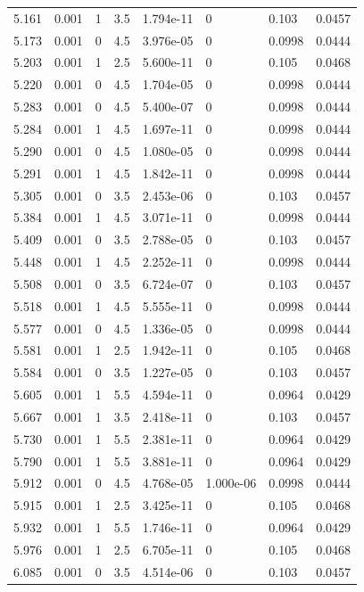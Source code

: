 \documentclass[preview]{standalone}
\begin{document}
{{{\begin{tabular}{L{1.2cm}C{1.2cm} C{0.3cm}C{0.5cm} C{1.4cm}C{1.4cm} C{1.4cm}C{1.4cm}}
  5.161  &  0.001  & 1     & 3.5 &  1.794e-11  & 0  & 0.103 &  0.0457   \\ 
  5.173  &  0.001  & 0     & 4.5 &  3.976e-05  & 0  & 0.0998 &  0.0444   \\ 
  5.203  &  0.001  & 1     & 2.5 &  5.600e-11  & 0  & 0.105 &  0.0468   \\ 
  5.220  &  0.001  & 0     & 4.5 &  1.704e-05  & 0  & 0.0998 &  0.0444   \\ 
  5.283  &  0.001  & 0     & 4.5 &  5.400e-07  & 0  & 0.0998 &  0.0444   \\ 
  5.284  &  0.001  & 1     & 4.5 &  1.697e-11  & 0  & 0.0998 &  0.0444   \\ 
  5.290  &  0.001  & 0     & 4.5 &  1.080e-05  & 0  & 0.0998 &  0.0444   \\ 
  5.291  &  0.001  & 1     & 4.5 &  1.842e-11  & 0  & 0.0998 &  0.0444   \\ 
  5.305  &  0.001  & 0     & 3.5 &  2.453e-06  & 0  & 0.103 &  0.0457   \\ 
  5.384  &  0.001  & 1     & 4.5 &  3.071e-11  & 0  & 0.0998 &  0.0444   \\ 
  5.409  &  0.001  & 0     & 3.5 &  2.788e-05  & 0  & 0.103 &  0.0457   \\ 
  5.448  &  0.001  & 1     & 4.5 &  2.252e-11  & 0  & 0.0998 &  0.0444   \\ 
  5.508  &  0.001  & 0     & 3.5 &  6.724e-07  & 0  & 0.103 &  0.0457   \\ 
  5.518  &  0.001  & 1     & 4.5 &  5.555e-11  & 0  & 0.0998 &  0.0444   \\ 
  5.577  &  0.001  & 0     & 4.5 &  1.336e-05  & 0  & 0.0998 &  0.0444   \\ 
  5.581  &  0.001  & 1     & 2.5 &  1.942e-11  & 0  & 0.105 &  0.0468   \\ 
  5.584  &  0.001  & 0     & 3.5 &  1.227e-05  & 0  & 0.103 &  0.0457   \\ 
  5.605  &  0.001  & 1     & 5.5 &  4.594e-11  & 0  & 0.0964 &  0.0429   \\ 
  5.667  &  0.001  & 1     & 3.5 &  2.418e-11  & 0  & 0.103 &  0.0457   \\ 
  5.730  &  0.001  & 1     & 5.5 &  2.381e-11  & 0  & 0.0964 &  0.0429   \\ 
  5.790  &  0.001  & 1     & 5.5 &  3.881e-11  & 0  & 0.0964 &  0.0429   \\ 
  5.912  &  0.001  & 0     & 4.5 &  4.768e-05  & 1.000e-06  & 0.0998 &  0.0444   \\ 
  5.915  &  0.001  & 1     & 2.5 &  3.425e-11  & 0  & 0.105 &  0.0468   \\ 
  5.932  &  0.001  & 1     & 5.5 &  1.746e-11  & 0  & 0.0964 &  0.0429   \\ 
  5.976  &  0.001  & 1     & 2.5 &  6.705e-11  & 0  & 0.105 &  0.0468   \\ 
  6.085  &  0.001  & 0     & 3.5 &  4.514e-06  & 0  & 0.103 &  0.0457   \\ 
\hline 
\end{tabular} 

}}}
\end{document}
